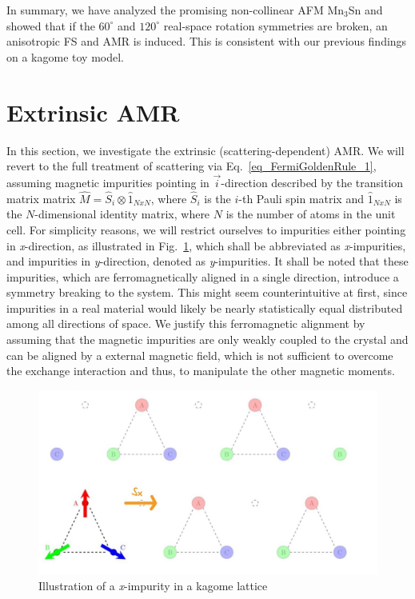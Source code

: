 \documentclass[prb,showpacs,amsmath,amssymb,superscriptaddress,twocolumn,floatfix]{revtex4-1}
\begin{document}
In summary, we have analyzed the promising non-collinear AFM Mn$_3$Sn and showed that if the $60^\circ$ and $120^\circ$ real-space rotation symmetries are broken, an anisotropic FS and AMR is induced. This is consistent with our previous findings on a kagome toy model.




\section{Extrinsic AMR}
\label{sec_extrinsic}

In this section, we investigate the extrinsic (scattering-dependent) AMR. We will revert to the full treatment of scattering via Eq.~\ref{eq_FermiGoldenRule_1}, assuming magnetic impurities pointing in $\vec{i}$-direction described by the transition matrix matrix $\hat{M} = \hat{S}_i \otimes \hat{1}_{NxN}$, where $\hat{S}_i$ is the $i$-th Pauli spin matrix and $\hat{1}_{NxN}$ is the $N$-dimensional identity matrix, where $N$ is the number of atoms in the unit cell. For simplicity reasons, we will restrict ourselves to impurities either pointing in \textit{x}-direction, as illustrated in Fig.~\ref{fig:kagome21}, which shall be abbreviated as \textit{x}-impurities, and impurities in \textit{y}-direction, denoted as \textit{y}-impurities. It shall be noted that these impurities, which are ferromagnetically aligned in a single direction, introduce a symmetry breaking to the system. This might seem counterintuitive at first, since impurities in a real material would likely be nearly statistically equal distributed among all directions of space. We justify this ferromagnetic alignment by assuming that the magnetic impurities are only weakly coupled to the crystal and can be aligned by a external magnetic field, which is not sufficient to overcome the exchange interaction and thus, to manipulate the other magnetic moments.
\begin{figure}
	\centering
	\includegraphics[width=0.8\linewidth]{img/Kagome_21}
	\caption{Illustration of a \textit{x}-impurity in a kagome lattice}
	\label{fig:kagome21}
\end{figure}
\end{document}
